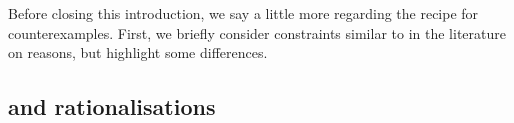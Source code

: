 \begin{note}
  Before closing this introduction, we say a little more regarding the recipe for counterexamples.
  First, we briefly consider constraints similar to \issueInclusion{} in the literature on reasons, but highlight some differences.
\end{note}

\subsection*{\issueInclusion{} and rationalisations}
\label{sec:reasons}



